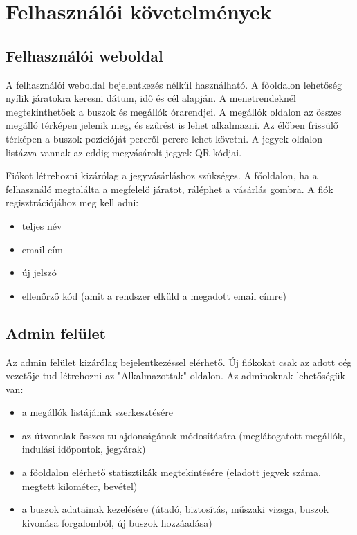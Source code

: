 
\section{Felhasználói követelmények}

\subsection{Felhasználói weboldal}
A felhasználói weboldal bejelentkezés nélkül használható. A főoldalon lehetőség nyílik járatokra keresni dátum, idő és cél alapján. A menetrendeknél megtekinthetőek a buszok és megállók órarendjei. A megállók oldalon az összes megálló térképen jelenik meg, és szűrést is lehet alkalmazni. Az élőben frissülő térképen a buszok pozícióját percről percre lehet követni. A jegyek oldalon listázva vannak az eddig megvásárolt jegyek QR-kódjai.

Fiókot létrehozni kizárólag a jegyvásárláshoz szükséges. A főoldalon, ha a felhasználó megtalálta a megfelelő járatot, ráléphet a vásárlás gombra. A fiók regisztrációjához meg kell adni:
\begin{itemize}
    \item teljes név
    \item email cím
    \item új jelszó
    \item ellenőrző kód (amit a rendszer elküld a megadott email címre)
\end{itemize}

\subsection{Admin felület}
Az admin felület kizárólag bejelentkezéssel elérhető. Új fiókokat csak az adott cég vezetője tud létrehozni az "Alkalmazottak" oldalon. Az adminoknak lehetőségük van:
\begin{itemize}
    \item a megállók listájának szerkesztésére
    \item az útvonalak összes tulajdonságának módosítására (meglátogatott megállók, indulási időpontok, jegyárak)
    \item a főoldalon elérhető statisztikák megtekintésére (eladott jegyek száma, megtett kilométer, bevétel)
    \item a buszok adatainak kezelésére (útadó, biztosítás, műszaki vizsga, buszok kivonása forgalomból, új buszok hozzáadása)
\end{itemize}

